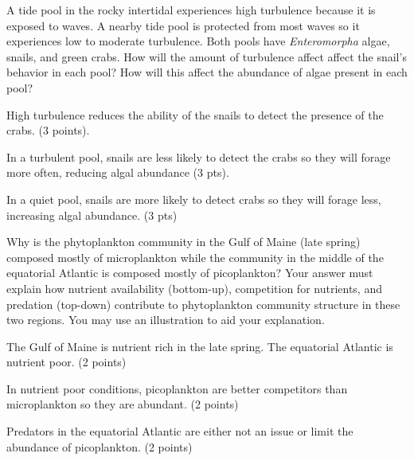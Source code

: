 \documentclass[12pt, addpoints]{exam}
\newenvironment{AnswerPage}[1]
    {\begin{minipage}[t][#1]{0.92\textwidth}%
    \begin{solution}}
    {\end{solution}\end{minipage}
    \vspace*{\stretch{1}}}
\begin{document}
\begin{questions}
%
\question[10] A tide pool in the rocky intertidal experiences high turbulence because it is exposed to waves. A nearby tide pool is protected from most waves so it experiences low to moderate turbulence. Both pools have \textit{Enteromorpha} algae, snails, and green crabs. How will the amount of turbulence affect affect the snail's behavior in each pool? How will this affect the abundance of algae present in each pool?

	\begin{AnswerPage}{0.5\textheight}%
	High turbulence reduces the ability of the snails to detect the presence of the crabs. (3 points).
	
	\vspace*{\baselineskip}
	
	In a turbulent pool, snails are less likely to detect the crabs so they will forage more often, reducing algal abundance (3 pts).
	
	\vspace*{\baselineskip}
		
	In a quiet pool, snails are more likely to detect crabs so they will forage less, increasing algal abundance. (3 pts)
	
	\end{AnswerPage}


\newpage

%
\question[20]
Why is the phytoplankton community in the Gulf of Maine (late spring) composed mostly of microplankton while the community in the middle of the equatorial Atlantic is composed mostly of picoplankton? Your answer must explain how nutrient availability (bottom-up), competition for nutrients, and predation (top-down) contribute to phytoplankton community structure in these two regions. You may use an illustration to aid your explanation.

	\begin{AnswerPage}{0.4\textheight}%
	The Gulf of Maine is nutrient rich in the late spring. The equatorial Atlantic is nutrient poor. (2 points)
	
	\vspace*{\baselineskip}
	
	In nutrient poor conditions, picoplankton are better competitors than microplankton so they are abundant. (2 points)
	\vspace*{\baselineskip}
	
	Predators in the equatorial Atlantic are either not an issue or limit the abundance of picoplankton. (2 points)
	
	\vspace*{\baselineskip}


\end{AnswerPage}
\end{questions}
\end{document}
